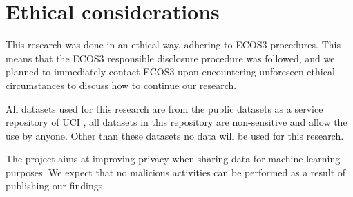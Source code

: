 \section{Ethical considerations}
This research was done in an ethical way, adhering to ECOS3 \cite{ecos3} procedures. This means that the ECOS3 responsible disclosure procedure was followed, and we planned to immediately contact ECOS3 upon encountering unforeseen ethical circumstances to discuss how to continue our research.

All datasets used for this research are from the public datasets as a service repository of UCI \cite{datasetsrepo}, all datasets in this repository are non-sensitive and allow the use by anyone. Other than these datasets no data will be used for this research.

The project aims at improving privacy when sharing data for machine learning purposes. We expect that no malicious activities can be performed as a result of publishing our findings.